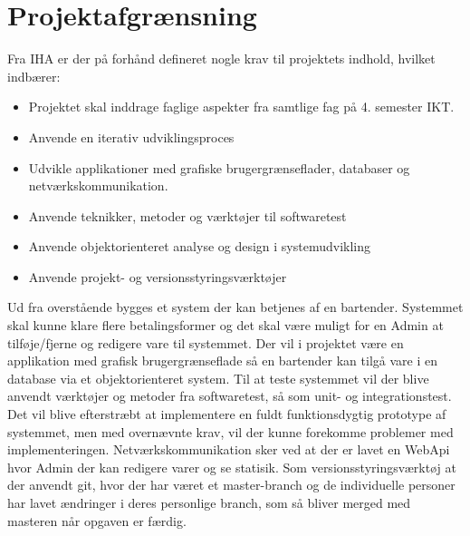 \chapter{Projektafgrænsning}
Fra IHA  er der på forhånd defineret nogle krav til projektets indhold, hvilket indbærer:
\begin{itemize}
\item Projektet skal inddrage faglige aspekter fra samtlige fag på 4. semester IKT. 
\item Anvende en iterativ udviklingsproces
\item Udvikle applikationer med grafiske brugergrænseflader, databaser og
netværkskommunikation.
\item Anvende teknikker, metoder og værktøjer til softwaretest
\item Anvende objektorienteret analyse og design i systemudvikling
\item Anvende projekt- og versionsstyringsværktøjer
\newline\newline
\end{itemize}

Ud fra overstående bygges et system der kan betjenes af en bartender. Systemmet skal kunne klare flere betalingsformer og det skal være muligt for en Admin at tilføje/fjerne og redigere vare til systemmet.  
\newline\newline
Der vil i projektet være en applikation med grafisk brugergrænseflade så en bartender kan tilgå vare i en database via et objektorienteret system. 
\newline\newline
Til at teste systemmet vil der blive anvendt værktøjer og metoder fra softwaretest, så som unit- og integrationstest. 
\newline\newline
Det vil blive efterstræbt at implementere en fuldt funktionsdygtig prototype af systemmet, men med overnævnte krav, vil der kunne forekomme problemer med implementeringen. 
\newline\newline
Netværkskommunikation sker ved at der er lavet en WebApi hvor Admin der kan redigere varer og se statisik.  
\newline\newline
Som versionsstyringsværktøj at der anvendt git, hvor der har været et master-branch og de individuelle personer har lavet ændringer i deres personlige branch, som så bliver merged med masteren når opgaven er færdig.  
